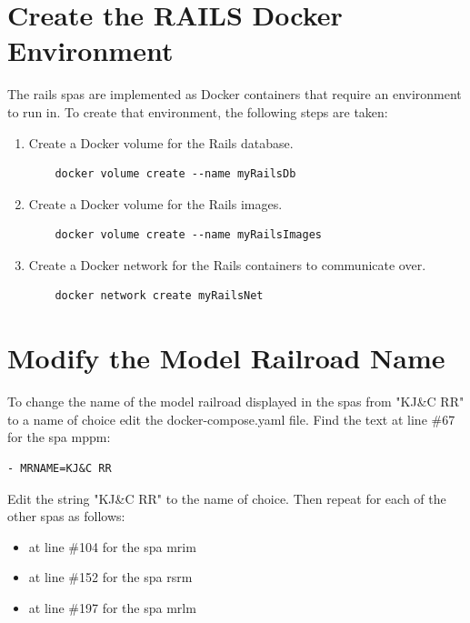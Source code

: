 \section{Create the RAILS Docker Environment}
\label{sec:railsdockerenv}
The \gls{rails} \glspl{spa} are implemented as Docker containers that require an environment to run in. To create that environment, the following steps are taken:
\begin{enumerate}
    \item Create a Docker volume for the Rails database.
    \begin{verbatim}
    docker volume create --name myRailsDb  
    \end{verbatim}
    \item Create a Docker volume for the Rails images.
    \begin{verbatim}
    docker volume create --name myRailsImages
    \end{verbatim}
    \item Create a Docker network for the Rails containers to communicate over.
    \begin{verbatim}
    docker network create myRailsNet
    \end{verbatim}
\end{enumerate}
\section{Modify the Model Railroad Name}
To change the name of the model railroad displayed in the \glspl{spa} from "KJ\&C RR" to a name of choice edit the docker-compose.yaml file.
Find the text at line \#67 for the \gls{spa} \gls{mppm}:
    \begin{verbatim}
- MRNAME=KJ&C RR
    \end{verbatim}
Edit the string "KJ\&C RR" to the name of choice. Then repeat for each of the other \glspl{spa} as follows:
\begin{itemize}
    \item at line \#104 for the \gls{spa} \gls{mrim}
    \item at line \#152 for the \gls{spa} \gls{rsrm}
    \item at line \#197 for the \gls{spa} \gls{mrlm}
\end{itemize}
